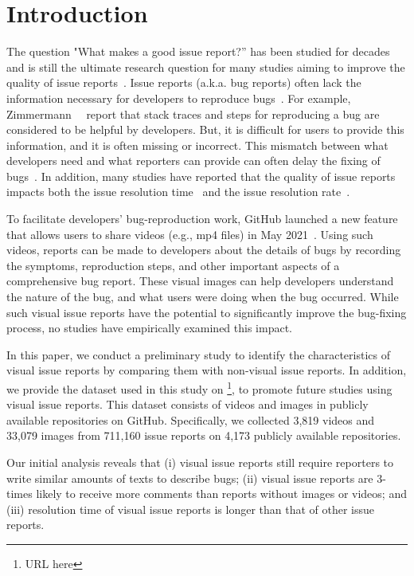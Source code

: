 \section{Introduction}
\label{sec:intro}
The question "What makes a good issue report?'' has been studied for decades and is still the ultimate research question for many studies aiming to improve the quality of issue reports~\citep{DBLP:conf/icse/HerzigJZ13}\citep{zimmermann2010TSE}\citep{DBLP:conf/eclipse/BettenburgJSWPZ07}. Issue reports (a.k.a. bug reports) often lack the information necessary for developers to reproduce bugs~\citep{DBLP:conf/msr/JoorabchiMM14}\citep{DearGitHub}. 
For example, Zimmermann~\et~\citep{zimmermann2010TSE} report that stack traces and steps for reproducing a bug are considered to be helpful by developers. But, it is difficult for users to provide this information, and it is often missing or incorrect. 
This mismatch between what developers need and what reporters can provide can often delay the fixing of bugs~\citep{DBLP:conf/msr/JoorabchiMM14}. In addition, many studies have reported that the quality of issue reports impacts both the issue resolution time~\citep{DBLP:conf/cscw/BreuPSZ10}\citep{DBLP:conf/icse/GuoZNM10} and the issue resolution rate~\citep{DBLP:conf/compsac/ZouXZCL15}\citep{DBLP:conf/icse/ZimmermannNGM12}. 

To facilitate developers' bug-reproduction work, GitHub launched a new feature that allows users to share videos (e.g., mp4 files) in May 2021~\citep{github-video-blog}. Using such videos, reports can be made to developers about the details of bugs by recording the symptoms, reproduction steps, and other important aspects of a comprehensive bug report. These visual images can help developers understand the nature of the bug, and what users were doing when the bug occurred. While such visual issue reports have the potential to significantly improve the bug-fixing process, no studies have empirically examined this impact. 

In this paper, we conduct a preliminary study to identify the characteristics of visual issue reports by comparing them with non-visual issue reports.  In addition, we provide the dataset used in this study on \footnote{URL here}, to promote future studies using visual issue reports. This dataset consists of videos and images in publicly available repositories on GitHub. Specifically, we collected 3,819 videos and 33,079 images from 711,160 issue reports on 4,173 publicly available repositories.


Our initial analysis reveals that (i) visual issue reports still require reporters to write similar amounts of texts to describe bugs; (ii) visual issue reports are 3-times likely to receive more comments than reports without images or videos; and (iii) resolution time of visual issue reports is longer than that of other issue reports. 
